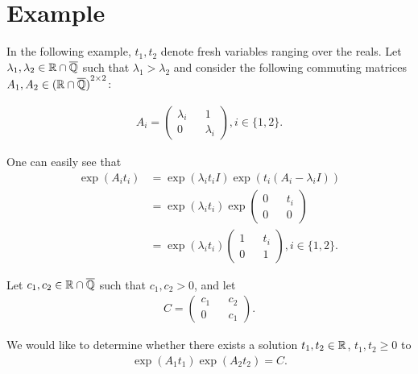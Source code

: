 \section{Example}

In the following example, $t_{1},t_{2}$ denote fresh variables ranging over the reals.
Let $\lambda_{1}, \lambda_{2} \in \mathbb{R} \cap \overline{\mathbb{Q}}$ such that $\lambda_{1} > \lambda_{2}$ and consider the following commuting matrices $A_{1}, A_{2} \in {(\mathbb{R}\cap \overline{\mathbb{Q}})}^{2 \times 2}$:

\begin{align*}
A_{i} = \begin{pmatrix} \lambda_{i} && 1 \\ 0 && \lambda_{i} \end{pmatrix}, i \in \lbrace 1, 2 \rbrace .
\end{align*}

One can easily see that
\begin{align*}
\exp(A_{i} t_{i}) &= \exp(\lambda_{i} t_{i} I) \exp(t_{i} (A_{i} - \lambda_{i} I)) \\
&= \exp(\lambda_{i} t_{i})
\exp \begin{pmatrix} 0 && t_{i} \\ 0 && 0 \end{pmatrix} \\
&= \exp (\lambda_{i} t_{i})
\begin{pmatrix} 1 && t_{i} \\ 0 && 1 \end{pmatrix}, i \in \lbrace 1, 2 \rbrace .
\end{align*}

Let $c_{1}, c_{2} \in \mathbb{R} \cap \overline{\mathbb{Q}}$ such that $c_{1}, c_{2} > 0$, and let
\begin{align*}
C = \begin{pmatrix} c_{1} && c_{2} \\ 0 && c_{1} \end{pmatrix} .
\end{align*}

We would like to determine whether there exists a solution $t_{1}, t_{2} \in \mathbb{R}$, $t_{1}, t_{2} \geq 0$ to
\begin{align*}
\exp(A_{1} t_{1}) \exp(A_{2} t_{2}) = C.
\end{align*}


